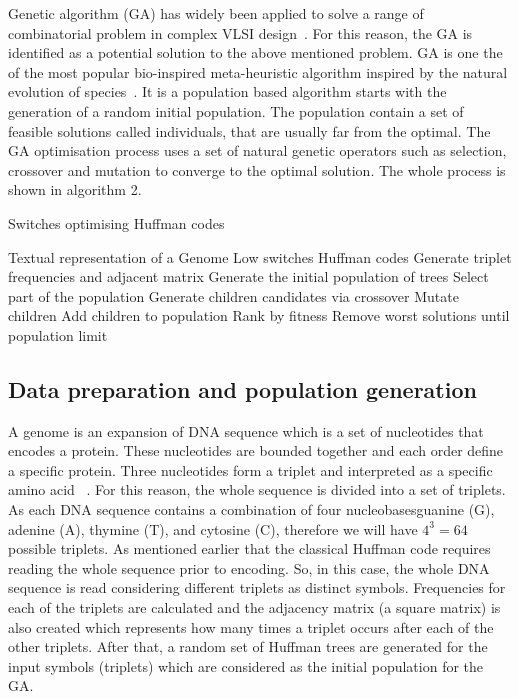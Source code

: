 \documentclass[preprint,12pt]{elsarticle}
\begin{document}
Genetic algorithm (GA) has widely been applied to solve a range of combinatorial problem in complex VLSI design~\cite{chan1991macro,bright1996genetic,cohoon1987genetic}. For this reason, the GA is identified as a potential solution to the above mentioned problem. GA is one the of the most popular bio-inspired meta-heuristic algorithm inspired by the natural evolution of species~\cite{gen1}. It is a population based algorithm starts with the generation of a random initial population. The population contain a set of feasible solutions called individuals, that are usually far from the optimal. The GA optimisation process uses a set of natural genetic operators such as selection, crossover and mutation to converge to the optimal solution. The whole process is shown in algorithm 2.
\begin{algorithm}[!btph]
\caption{Switches optimising Huffman codes}
\label{alg1}
\begin{algorithmic}[1]
\REQUIRE Textual representation of a Genome
\ENSURE Low switches Huffman codes
\STATE Generate triplet frequencies and adjacent matrix 
\STATE Generate the initial  population of trees
\REPEAT 
\STATE Select part of the population
\STATE Generate children candidates via crossover
\STATE Mutate children
\STATE Add children to population
\STATE Rank by fitness
\STATE Remove worst solutions until population limit
\end{algorithmic}
\end{algorithm}
\subsection{ Data preparation and population generation}
A genome is an expansion of DNA sequence which is a set of nucleotides that encodes a protein. These nucleotides are bounded together and each order define a specific protein. Three nucleotides form a triplet and interpreted as a specific amino acid ~\cite{Harvey00}. For this reason, the whole sequence is divided into a set of triplets.  As each DNA sequence contains a combination of four nucleobases\textemdash guanine (G), adenine (A), thymine (T), and cytosine (C), therefore we will have $4^3=64$ possible triplets. As mentioned earlier that the classical Huffman code requires reading the whole sequence prior to encoding. So, in this case, the whole DNA sequence is read considering different triplets as distinct symbols. Frequencies for each of the triplets are calculated and  the adjacency matrix (a square matrix) is also created which represents how many times a triplet occurs after each of the other triplets.  After that, a random set of Huffman trees are generated for the input symbols (triplets) which are considered as the initial population for the GA.
\end{document}

